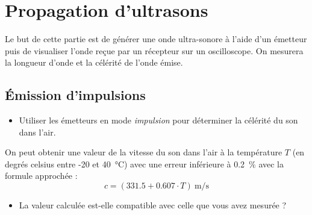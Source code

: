 \documentclass[]{tp}
\begin{document}
\section{Propagation d'ultrasons}
Le but de cette partie est de générer une onde ultra-sonore à l'aide d'un émetteur puis de visualiser l'onde reçue par un récepteur sur un oscilloscope. On mesurera la longueur d'onde et la célérité de l'onde émise.
  \begin{center}
  \end{center}
 
\subsection{Émission d'impulsions}
\begin{itemize}
  \item Utiliser les émetteurs en mode \emph{impulsion} pour déterminer la célérité du son dans l'air.
\end{itemize}
 On peut obtenir une valeur de la vitesse du son dans l'air à la température $T$ (en degrés celsius entre -20 et \SI{+40}{\celsius}) avec une erreur inférieure à \SI{0.2}{\percent} avec la formule approchée :
    \begin{equation*}
      c=(331.5+0.607\cdot T)~\si{\m\per\s}
    \end{equation*}
\begin{itemize}
  \item La valeur calculée est-elle compatible avec celle que vous avez mesurée ?
\end{itemize}
\end{document}
